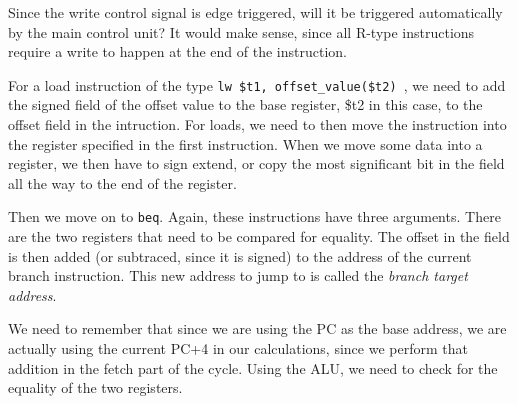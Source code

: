 \documentclass{article}
\begin{document}
Since the write control signal is edge triggered, will it be triggered automatically by the main control unit?
It would make sense, since all R-type instructions require a write to happen at the end of the instruction.


For a load instruction of the type \texttt{lw \$t1, offset\_value(\$t2) }, we need to add the signed field of the
offset value to the base register, \$t2 in this case, to the offset field in the intruction. For loads, we need
to then move the instruction into the register specified in the first instruction. When we move some data into
a register, we then have to sign extend, or copy the most significant bit in the field all the way to the end
of the register.

Then we move on to \texttt{beq}. Again, these instructions have three arguments. There are the two registers
that need to be compared for equality. The offset in the field is then added (or subtraced, since it is signed) 
to the address of the current branch instruction. This new address to jump to is called the \textit{branch 
target address}.
 
We need to remember that since we are using the PC as the base address, we are actually using the current PC+4
in our calculations, since we perform that addition in the fetch part of the cycle. Using the ALU, we need 
to check for the equality of the two registers.
\end{document}

